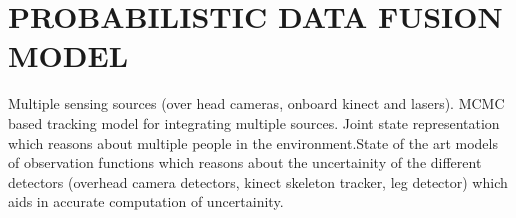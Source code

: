 \section{PROBABILISTIC DATA FUSION MODEL}

Multiple sensing sources (over head cameras, onboard kinect and lasers). MCMC based tracking model for integrating multiple sources. Joint state representation which reasons about multiple people in the environment.State of the art models of observation functions which reasons about the uncertainity of the different detectors (overhead camera detectors, kinect skeleton tracker, leg detector) which aids in accurate computation of uncertainity.
